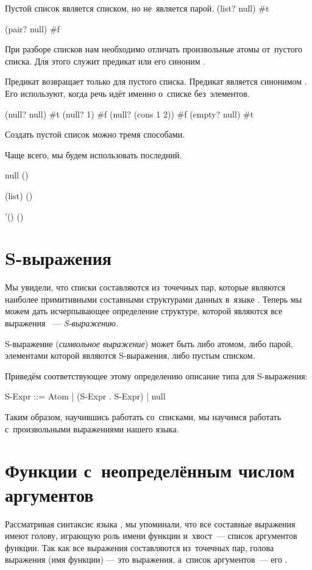 \begin{example}{%
Пустой список является списком, но не~является парой.} 
\REPL
  {(list? null)}
  {#t} 

\REPL
  {(pair? null)}
  {#f}
\end{example}

При разборе списков нам необходимо отличать произвольные атомы от~пустого списка. Для этого служит предикат  или его синоним .

\begin{example}{%
Предикат  возвращает   только для пустого списка.
Предикат  является синонимом . Его используют, когда речь идёт именно о~списке без~элементов.}

\REPL
  {(null? null)}
  {#t}
\REPL
  {(null? 1)}
  {#f}
\REPL
  {(null? (cons 1 2))}
  {#f}
\REPL
  {(empty? null)}
  {#t}
\end{example}

\begin{example}{Создать пустой список можно тремя способами.

Чаще всего, мы будем использовать последний.}
\REPL
  {null}
  {()}

\REPL
  {(list)}
  {()}

\REPL
  {'()}
  {()}
\end{example}

\section[2]{S-выражения}\label{Sec:S-expr}%
Мы увидели, что списки составляются из~точечных пар, которые являются наиболее примитивными составными структурами данных в~языке \Scheme. Теперь мы можем дать исчерпывающее определение структуре, которой являются все выражения \Scheme~--- \emph{S-выражению.}

S-выражение (\emph{символьное выражение}) может быть либо атомом, либо парой, элементами которой являются S-выражения, либо пустым списком. 

Приведём соответствующее этому определению описание типа для S-выражения:
\begin{type}
S-Expr ::= Atom | (S-Expr . S-Expr) | null
\end{type}

Таким образом, научившись работать со~списками, мы научимся работать с~произвольными выражениями нашего языка.

\section[4]{Функции с~неопределённым числом аргументов}%
Рассматривая синтаксис языка \Scheme, мы упоминали, что все составные выражения имеют голову, играющую роль имени функции и~хвост~--- список аргументов функции. Так как все выражения \Scheme составляются из~точечных пар, голова выражения (имя функции) --- это  выражения, а~список аргументов~--- его .

